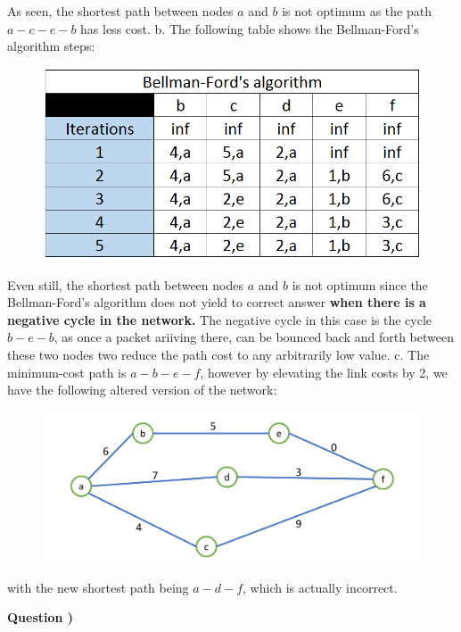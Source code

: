 \documentclass[10pt,letterpaper]{article}
\newcounter{QuestionNumber}
\newcommand{\Q}{
\textbf{Question \theQuestionNumber)}
\stepcounter{QuestionNumber}
}
\newcommand{\nl}{\newline\newline}
\begin{document}
As seen, the shortest path between nodes $a$ and $b$ is not optimum as the path $a-c-e-b$ has less cost.
\nl
b. The following table shows the Bellman-Ford's algorithm steps:
\begin{figure}[h!]
\centering
\includegraphics[width=140mm]{PSol6_Q2_2.png}
\end{figure}

Even still, the shortest path between nodes $a$ and $b$ is not optimum since the Bellman-Ford's algorithm does not yield to correct answer \textbf{when there is a negative cycle in the network.} The negative cycle in this case is the cycle $b-e-b$, as once a packet ariiving there, can be bounced back and forth between these two nodes two reduce the path cost to any arbitrarily low value.
\nl
c. The minimum-cost path is $a-b-e-f$, however by elevating the link costs by 2, we have the following altered version of the network:
\begin{figure}[h!]
\centering
\includegraphics[width=140mm]{PSol6_Q2_3.pdf}
\end{figure}

with the new shortest path being $a-d-f$, which is actually incorrect.
\nl
\Q
\end{document}
